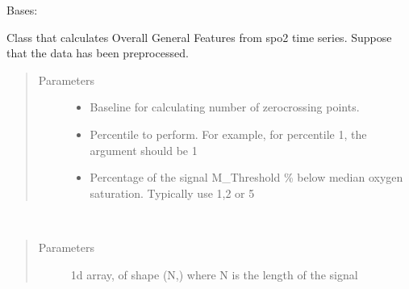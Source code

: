 \documentclass[letterpaper,10pt,english]{sphinxmanual}
\begin{document}
\begin{fulllineitems}
\label{\detokenize{pobm.obm:pobm.obm.general.OverallGeneralMeasures}}
Bases: 

Class that calculates Overall General Features from spo2 time series.
Suppose that the data has been preprocessed.
\begin{quote}\begin{description}
\item[{Parameters}] \leavevmode\begin{itemize}
\item {} 
 \textendash{} Baseline for calculating number of zero\sphinxhyphen{}crossing points.

\item {} 
 \textendash{} Percentile to perform. For example, for percentile 1, the argument should be 1

\item {} 
 \textendash{} Percentage of the signal M\_Threshold \% below median oxygen saturation. Typically use 1,2 or 5

\end{itemize}

\end{description}\end{quote}

\begin{fulllineitems}
\label{\detokenize{pobm.obm:pobm.obm.general.OverallGeneralMeasures.compute}}~\begin{quote}\begin{description}
\item[{Parameters}] \leavevmode
{} \textendash{} 1\sphinxhyphen{}d array, of shape (N,) where N is the length of the signal


\end{description}
\end{quote}
\end{fulllineitems}
\end{fulllineitems}
\end{document}
